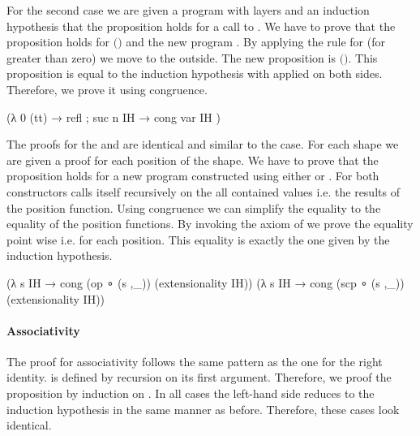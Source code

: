 \begin{AgdaAlign}
For the second case we are given a program  with
\AgdaSpace{} layers and an
induction hypothesis  that the proposition holds for a call to
\AgdaSpace{}.
We have to prove that the proposition holds for
\AgdaSpace{}$($\AgdaSpace{}$)$
and the new program \AgdaSpace{}.
By applying the \AgdaFunction{>>=} rule for  (for
 greater than zero) we move  to
the outside.
The new proposition is
\AgdaSpace{}$($\AgdaSpace{}$)$\AgdaSpace{}\AgdaSpace{}\AgdaSpace{}.
This proposition is equal to the induction hypothesis with
 applied on both sides.
Therefore, we prove it using congruence.

\begin{code}
  (λ{ {0} (tt) → refl ; {suc n} IH → cong var IH })
\end{code}
The proofs for the  and
 are identical and similar to the
 case. For each shape  we are
given a proof for each position of the shape.
We have to prove that the proposition holds for a new program constructed using
either  or .
For both constructors \AgdaSpace{} calls
itself recursively on the all contained values i.e. the results of the position
function.
Using congruence we can simplify the equality to the equality of the position
functions.
By invoking the axiom of  we prove the equality
point wise i.e. for each position.
This equality is exactly the one given by the induction hypothesis.

\begin{code}
  (λ s IH → cong (op   ∘ (s ,_)) (extensionality IH))
  (λ s IH → cong (scp  ∘ (s ,_)) (extensionality IH))
\end{code}
\end{AgdaAlign}

\paragraph{Associativity}
The proof for associativity follows the same pattern as the one for the right
identity.
\AgdaFunction{>>=} is defined by recursion on its first argument.
Therefore, we proof the proposition by induction on .
In all cases the left-hand side reduces to the induction hypothesis in the same
manner as before.
Therefore, these cases look identical.

